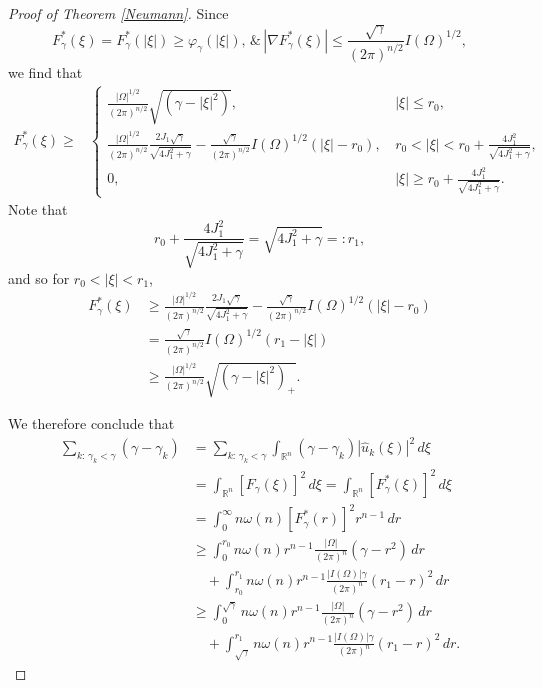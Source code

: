 \documentclass[11pt,twoside, leqno]{article}
\def\rr{{\mathbb R}}
\def\rn{{{\rr}^n}}
\numberwithin{equation}{section}
\begin{document}
\begin{proof}[Proof of Theorem \ref{Neumann}]
Since
$$F_\gamma^\ast(\xi)=F_\gamma^\ast(|\xi|)\ge \varphi_\gamma(|\xi|), \,\&\, |\nabla F_\gamma^\ast(\xi)|\le \frac{\sqrt\gamma}{(2\pi)^{n/2}}I(\Omega)^{1/2},$$
we find that
\begin{align}
F_\gamma^\ast(\xi)\ge &
\begin{cases}
\frac{|\Omega|^{1/2}}{(2\pi)^{n/2}}\sqrt{(\gamma-|\xi|^2)}, &\, |\xi|\le r_0,\\
\frac{|\Omega|^{1/2}}{(2\pi)^{n/2}}\frac{2J_1\sqrt\gamma}{\sqrt{4J_1^2+\gamma}}-\frac{\sqrt\gamma}{(2\pi)^{n/2}}I(\Omega)^{1/2} (|\xi|-r_0), & \, r_0<|\xi|<r_0+\frac{4J_1^2}{\sqrt{4J_1^2+\gamma}},\\
0,&\, |\xi|\ge r_0+\frac{4J_1^2}{\sqrt{4J_1^2+\gamma}}.
\end{cases}
\end{align}
Note that
$$r_0+\frac{4J_1^2}{\sqrt{4J_1^2+\gamma}}=\sqrt{4J_1^2+\gamma}=:r_1,$$
and so for $r_0<|\xi|<r_1$,
\begin{align*}
F_\gamma^\ast(\xi)&\ge \frac{|\Omega|^{1/2}}{(2\pi)^{n/2}}\frac{2J_1\sqrt\gamma}{\sqrt{4J_1^2+\gamma}}-\frac{\sqrt\gamma}{(2\pi)^{n/2}}I(\Omega)^{1/2} (|\xi|-r_0)\\
&=\frac{\sqrt\gamma}{(2\pi)^{n/2}}I(\Omega)^{1/2} (r_1-|\xi|)\\
&\ge \frac{|\Omega|^{1/2}}{(2\pi)^{n/2}}\sqrt{(\gamma-|\xi|^2)_+}.
\end{align*}


We therefore conclude that
\begin{align*}
\sum_{k:\,\gamma_k<\gamma} (\gamma-\gamma_k)&=\sum_{k:\,\gamma_k<\gamma} \int_{\rn}(\gamma-\gamma_k)|\hat{u}_k(\xi)|^2\,d\xi\\
&=\int_{\rn} [F_\gamma(\xi)]^2\,d\xi=\int_{\rn}  [F_\gamma^\ast(\xi)]^2\,d\xi\\
&=\int_0^\infty   {n} {\omega(n) } [F_\gamma^\ast(r)]^2 r^{n-1}\,dr\\
&\ge \int_0^{r_0}  {n}{\omega(n) r^{n-1} } \frac{|\Omega|}{(2\pi)^{n}}{(\gamma-r^2)}\,dr \\
&\quad+\int_{r_0}^{r_1} {n}{\omega(n) r^{n-1} } \frac{|I(\Omega)|\gamma}{(2\pi)^{n}}\left(r_1-r\right)^2\,dr\\
&\ge \int_0^{\sqrt\gamma}  {n}{\omega(n) r^{n-1} } \frac{|\Omega|}{(2\pi)^{n}}{(\gamma-r^2)}\,dr\\
&\quad+\int_{\sqrt\gamma}^{r_1} {n}{\omega(n) r^{n-1} } \frac{|I(\Omega)|\gamma}{(2\pi)^{n}}\left(r_1-r\right)^2\,dr.
\end{align*}


\end{proof}
\end{document}
